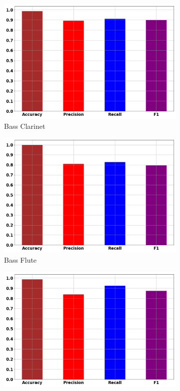 \documentclass[12pt,letterpaper]{article}
\begin{document}
\begin{figure}[H]
	\begin{subfigure}[b]{0.45\textwidth}
	\centering
	\includegraphics[width=\textwidth]{../FiguresClasses/BassClarinet}
	\caption{Bass Clarinet}
	\end{subfigure}	
	\begin{subfigure}[b]{0.45\textwidth}
	\centering
	\includegraphics[width=\textwidth]{../FiguresClasses/BassFlute}
	\caption{Bass Flute}
	\end{subfigure}	
	\begin{subfigure}[b]{0.45\textwidth}
	\centering
	\includegraphics[width=\textwidth]{../FiguresClasses/Bassoon}

\end{subfigure}
\end{figure}
\end{document}
